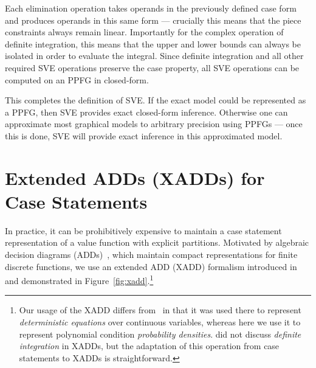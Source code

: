 \documentclass[letterpaper]{article}
\begin{document}
{Each elimination operation takes operands in the previously defined
case form and produces operands in this same form --- crucially this means
that the piece constraints always remain linear.  Importantly for the
complex operation of definite integration, this means that the upper
and lower bounds can always be isolated in order to evaluate the
integral.  Since definite integration and all other
required SVE operations preserve the case property, 
all SVE operations can be computed on an PPFG in closed-form.

This completes the definition of SVE.  If the exact model could be
represented as a PPFG, then SVE provides exact closed-form inference.
Otherwise one can approximate most graphical models to arbitrary
precision using PPFGs --- once this is done, SVE will provide exact
inference in this approximated model.


\section{Extended ADDs (XADDs) for Case Statements}

In practice, it can be prohibitively expensive to maintain a case
statement representation of a value function with explicit partitions.
Motivated by algebraic decision diagrams (ADDs)~\cite{bahar93add},
which maintain compact representations for finite discrete functions,
we use an extended ADD (XADD) formalism introduced 
in~\cite{uai11} and demonstrated in 
Figure~\ref{fig:xadd}.\footnote{Our usage of the XADD differs
from~\cite{uai11} in that it was used there to represent
\emph{deterministic equations} over continuous variables, whereas
here we use it to represent polynomial condition \emph{probability
densities}.  \cite{uai11} did not discuss \emph{definite integration} in XADDs,
but the adaptation of this operation 
from case statements to XADDs is straightforward.}

}
\end{document}
